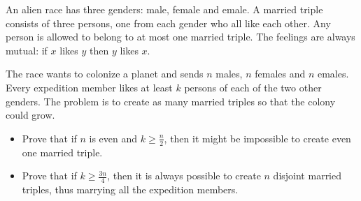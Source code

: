 An alien race has three genders: male, female and emale. A married triple consists of three persons, one from each gender who all like each other. Any person is allowed to belong to at most one married triple. The feelings are always mutual: if \(x\) likes \(y\) then \(y\) likes \(x\).

The race wants to colonize a planet and sends \(n\) males, \(n\) females and \(n\) emales. Every expedition member likes at least \(k\) persons of each of the two other genders. The problem is to create as many married triples so that the colony could grow.

\begin{itemize}
\item[(a)] Prove that if \(n\) is even and \(k \geq \frac{n}{2}\), then it might be impossible to create even one married triple.
\item[(b)] Prove that if \(k \geq \frac{3n}{4}\), then it is always possible to create \(n\) disjoint married triples, thus marrying all the expedition members.
\end{itemize}
